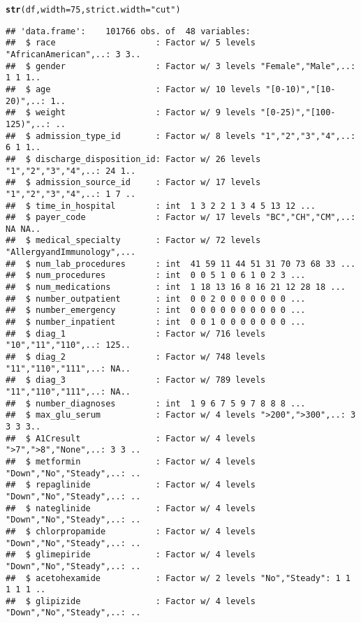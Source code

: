 \documentclass{article}\usepackage[]{graphicx}\usepackage[]{color}
\makeatletter
\newcommand{\hlnum}[1]{\textcolor[rgb]{0.686,0.059,0.569}{#1}}%
\newcommand{\hlstr}[1]{\textcolor[rgb]{0.192,0.494,0.8}{#1}}%
\newcommand{\hlstd}[1]{\textcolor[rgb]{0.345,0.345,0.345}{#1}}%
\newcommand{\hlkwc}[1]{\textcolor[rgb]{0.333,0.667,0.333}{#1}}%
\newcommand{\hlkwd}[1]{\textcolor[rgb]{0.737,0.353,0.396}{\textbf{#1}}}%
\newenvironment{kframe}{%
 \def\at@end@of@kframe{}%
 \ifinner\ifhmode%
  \def\at@end@of@kframe{\end{minipage}}%
  \begin{minipage}{\columnwidth}%
 \fi\fi%
 \def\FrameCommand##1{\hskip\@totalleftmargin \hskip-\fboxsep
 \colorbox{shadecolor}{##1}\hskip-\fboxsep
     \hskip-\linewidth \hskip-\@totalleftmargin \hskip\columnwidth}%
 \MakeFramed {\advance\hsize-\width
   \@totalleftmargin\z@ \linewidth\hsize
   \@setminipage}}%
 {\par\unskip\endMakeFramed%
 \at@end@of@kframe}
\newenvironment{knitrout}{}{} %
\makeatother
\begin{document}
\begin{knitrout}
\color{fgcolor}\begin{kframe}
\begin{alltt}
\hlkwd{str}\hlstd{(df,} \hlkwc{width}\hlstd{=}\hlnum{75}\hlstd{,} \hlkwc{strict.width}\hlstd{=}\hlstr{"cut"}\hlstd{)}
\end{alltt}
\begin{verbatim}
## 'data.frame':	101766 obs. of  48 variables:
##  $ race                    : Factor w/ 5 levels "AfricanAmerican",..: 3 3..
##  $ gender                  : Factor w/ 3 levels "Female","Male",..: 1 1 1..
##  $ age                     : Factor w/ 10 levels "[0-10)","[10-20)",..: 1..
##  $ weight                  : Factor w/ 9 levels "[0-25)","[100-125)",..: ..
##  $ admission_type_id       : Factor w/ 8 levels "1","2","3","4",..: 6 1 1..
##  $ discharge_disposition_id: Factor w/ 26 levels "1","2","3","4",..: 24 1..
##  $ admission_source_id     : Factor w/ 17 levels "1","2","3","4",..: 1 7 ..
##  $ time_in_hospital        : int  1 3 2 2 1 3 4 5 13 12 ...
##  $ payer_code              : Factor w/ 17 levels "BC","CH","CM",..: NA NA..
##  $ medical_specialty       : Factor w/ 72 levels "AllergyandImmunology",...
##  $ num_lab_procedures      : int  41 59 11 44 51 31 70 73 68 33 ...
##  $ num_procedures          : int  0 0 5 1 0 6 1 0 2 3 ...
##  $ num_medications         : int  1 18 13 16 8 16 21 12 28 18 ...
##  $ number_outpatient       : int  0 0 2 0 0 0 0 0 0 0 ...
##  $ number_emergency        : int  0 0 0 0 0 0 0 0 0 0 ...
##  $ number_inpatient        : int  0 0 1 0 0 0 0 0 0 0 ...
##  $ diag_1                  : Factor w/ 716 levels "10","11","110",..: 125..
##  $ diag_2                  : Factor w/ 748 levels "11","110","111",..: NA..
##  $ diag_3                  : Factor w/ 789 levels "11","110","111",..: NA..
##  $ number_diagnoses        : int  1 9 6 7 5 9 7 8 8 8 ...
##  $ max_glu_serum           : Factor w/ 4 levels ">200",">300",..: 3 3 3 3..
##  $ A1Cresult               : Factor w/ 4 levels ">7",">8","None",..: 3 3 ..
##  $ metformin               : Factor w/ 4 levels "Down","No","Steady",..: ..
##  $ repaglinide             : Factor w/ 4 levels "Down","No","Steady",..: ..
##  $ nateglinide             : Factor w/ 4 levels "Down","No","Steady",..: ..
##  $ chlorpropamide          : Factor w/ 4 levels "Down","No","Steady",..: ..
##  $ glimepiride             : Factor w/ 4 levels "Down","No","Steady",..: ..
##  $ acetohexamide           : Factor w/ 2 levels "No","Steady": 1 1 1 1 1 ..
##  $ glipizide               : Factor w/ 4 levels "Down","No","Steady",..: ..

\end{verbatim}
\end{kframe}
\end{knitrout}
\end{document}
